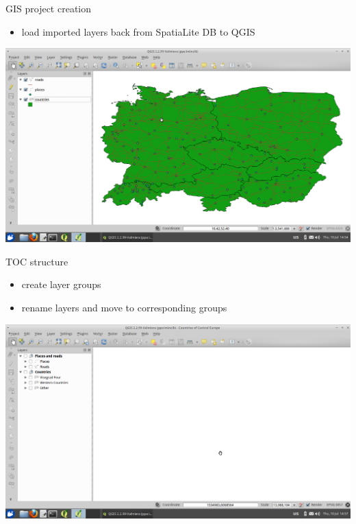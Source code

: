 \documentclass[12pt]{beamer}
\begin{document}
\begin{frame}{GIS project creation}
	\begin{itemize}
		\item load imported layers back from SpatiaLite DB to QGIS
	\end{itemize}
	\begin{center}
		\includegraphics[keepaspectratio=true,height=0.6\textheight]{images/rapid-gis-deployment/project-db-load-layers.png}
	\end{center}
\end{frame}


\begin{frame}{TOC structure}
	\begin{itemize}
		\item create layer groups
		\item rename layers and move to corresponding groups
	\end{itemize}
	\begin{center}
		\includegraphics[keepaspectratio=true,height=0.6\textheight]{images/rapid-gis-deployment/project-create-toc-structure.png}
	\end{center}
\end{frame}
\end{document}
